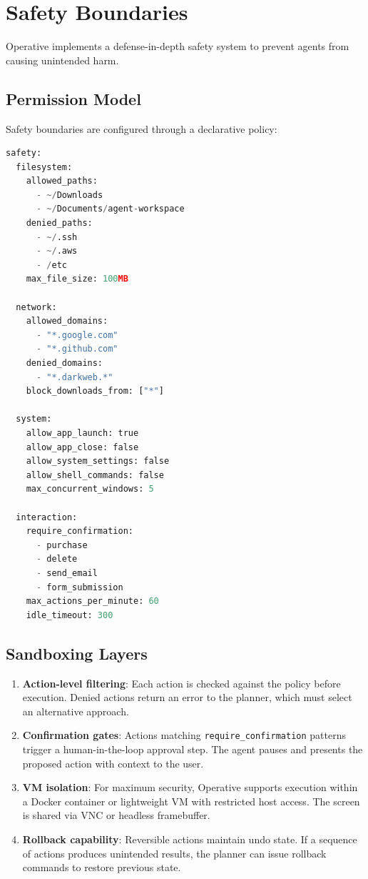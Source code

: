 \section{Safety Boundaries}

\label{sec:safety}

Operative implements a defense-in-depth safety system to prevent agents from causing unintended harm.

\subsection{Permission Model}

Safety boundaries are configured through a declarative policy:

\begin{lstlisting}[language=Python, caption=Safety boundary configuration]
safety:
  filesystem:
    allowed_paths:
      - ~/Downloads
      - ~/Documents/agent-workspace
    denied_paths:
      - ~/.ssh
      - ~/.aws
      - /etc
    max_file_size: 100MB

  network:
    allowed_domains:
      - "*.google.com"
      - "*.github.com"
    denied_domains:
      - "*.darkweb.*"
    block_downloads_from: ["*"]

  system:
    allow_app_launch: true
    allow_app_close: false
    allow_system_settings: false
    allow_shell_commands: false
    max_concurrent_windows: 5

  interaction:
    require_confirmation:
      - purchase
      - delete
      - send_email
      - form_submission
    max_actions_per_minute: 60
    idle_timeout: 300
\end{lstlisting}

\subsection{Sandboxing Layers}

\begin{enumerate}[leftmargin=*]
    \item \textbf{Action-level filtering}: Each action is checked against the policy before execution. Denied actions return an error to the planner, which must select an alternative approach.
    \item \textbf{Confirmation gates}: Actions matching \texttt{require\_confirmation} patterns trigger a human-in-the-loop approval step. The agent pauses and presents the proposed action with context to the user.
    \item \textbf{VM isolation}: For maximum security, Operative supports execution within a Docker container or lightweight VM with restricted host access. The screen is shared via VNC or headless framebuffer.
    \item \textbf{Rollback capability}: Reversible actions maintain undo state. If a sequence of actions produces unintended results, the planner can issue rollback commands to restore previous state.
\end{enumerate}

